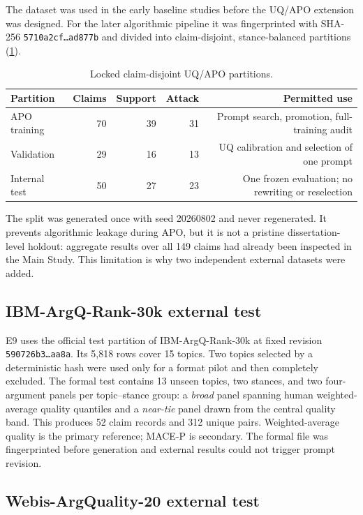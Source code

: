 \documentclass[11pt,twoside,a4paper]{report}
\begin{document}
The dataset was used in the early baseline studies before the UQ/APO extension was
designed.  For the later algorithmic pipeline it was fingerprinted with SHA-256
\texttt{5710a2cf\ldots ad877b} and divided into claim-disjoint, stance-balanced
partitions (\cref{tab:internal-splits}).

\begin{table}[htbp]
\centering
\caption{Locked claim-disjoint UQ/APO partitions.}
\label{tab:internal-splits}
\begin{tabular}{lrrrr}
\toprule
Partition & Claims & Support & Attack & Permitted use \\
\midrule
APO training & 70 & 39 & 31 & Prompt search, promotion, full-training audit \\
Validation & 29 & 16 & 13 & UQ calibration and selection of one prompt \\
Internal test & 50 & 27 & 23 & One frozen evaluation; no rewriting or reselection \\
\bottomrule
\end{tabular}
\end{table}

The split was generated once with seed 20260802 and never regenerated.  It prevents
algorithmic leakage during APO, but it is not a pristine dissertation-level holdout:
aggregate results over all 149 claims had already been inspected in the Main Study.
This limitation is why two independent external datasets were added.

\subsection{IBM-ArgQ-Rank-30k external test}

E9 uses the official test partition of IBM-ArgQ-Rank-30k at fixed revision
\texttt{590726b3\ldots aa8a}.  Its 5,818 rows cover 15 topics.  Two topics selected by
a deterministic hash were used only for a format pilot and then completely excluded.
The formal test contains 13 unseen topics, two stances, and two four-argument panels
per topic--stance group: a \emph{broad} panel spanning human weighted-average quality
quantiles and a \emph{near-tie} panel drawn from the central quality band.  This
produces 52 claim records and 312 unique pairs.  Weighted-average quality is the
primary reference; MACE-P is secondary.  The formal file was fingerprinted before
generation and external results could not trigger prompt revision.

\subsection{Webis-ArgQuality-20 external test}
\end{document}
